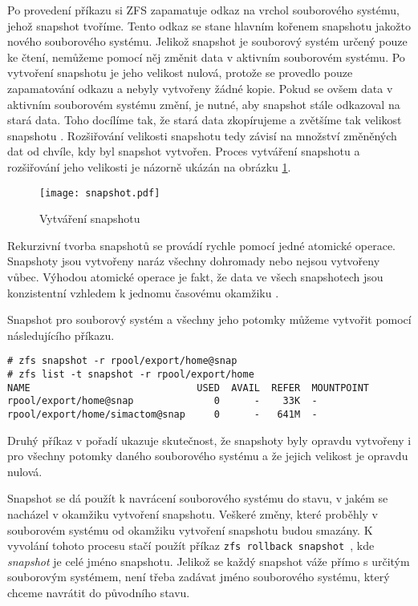 Po provedení příkazu si ZFS zapamatuje odkaz na vrchol souborového systému, jehož snapshot tvoříme. Tento odkaz se stane hlavním kořenem snapshotu jakožto nového souborového systému. Jelikož snapshot je souborový systém určený pouze ke čtení, nemůžeme pomocí něj změnit data v aktivním souborovém systému. Po vytvoření snapshotu je jeho velikost nulová, protože se provedlo pouze zapamatování odkazu a nebyly vytvořeny žádné kopie. Pokud se ovšem data v aktivním souborovém systému změní, je nutné, aby snapshot stále odkazoval na stará data. Toho docílíme tak, že stará data zkopírujeme a zvětšíme tak velikost snapshotu \cite{snapshot}. Rozšiřování velikosti snapshotu tedy závisí na množství změněných dat od chvíle, kdy byl snapshot vytvořen. Proces vytváření snapshotu a rozšiřování jeho velikosti je názorně ukázán na obrázku \ref{snapshotproces}.
\begin{figure}[h]
    \caption{Vytváření snapshotu}
    \label{snapshotproces}
    \texttt{[image: snapshot.pdf]}
\end{figure}

Rekurzivní tvorba snapshotů se provádí rychle pomocí jedné atomické operace. Snapshoty jsou vytvořeny naráz všechny dohromady nebo nejsou vytvořeny vůbec. Výhodou atomické operace je fakt, že data ve všech snapshotech jsou konzistentní vzhledem k jednomu časovému okamžiku \cite{snapshot}.

Snapshot pro souborový systém a všechny jeho potomky můžeme vytvořit pomocí následujícího příkazu.
\begin{verbatim}
# zfs snapshot -r rpool/export/home@snap
# zfs list -t snapshot -r rpool/export/home
NAME                             USED  AVAIL  REFER  MOUNTPOINT
rpool/export/home@snap              0      -    33K  -
rpool/export/home/simactom@snap     0      -   641M  -
\end{verbatim}
Druhý příkaz v pořadí ukazuje skutečnost, že snapshoty byly opravdu vytvořeny i pro všechny potomky daného souborového systému a že jejich velikost je opravdu nulová.

Snapshot se dá použít k navrácení souborového systému do stavu, v jakém se nacházel v okamžiku vytvoření snapshotu. Veškeré změny, které proběhly v souborovém systému od okamžiku vytvoření snapshotu budou smazány. K vyvolání tohoto procesu stačí použít příkaz \verb|zfs rollback snapshot |, kde \emph{snapshot} je celé jméno snapshotu. Jelikož se každý snapshot váže přímo s určitým souborovým systémem, není třeba zadávat jméno souborového systému, který chceme navrátit do původního stavu. 